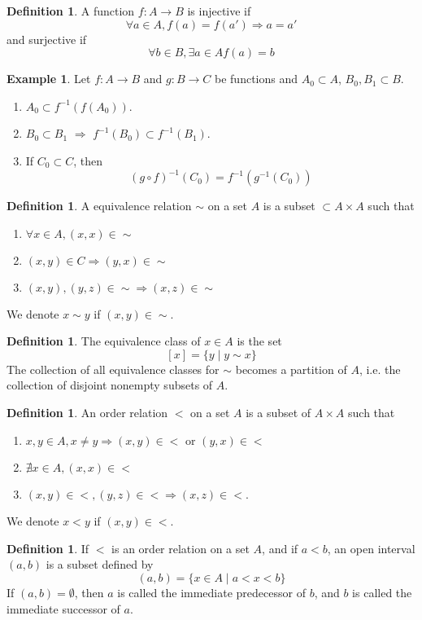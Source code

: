 \documentclass{beamer}
\theoremstyle{plain}
\theoremstyle{definition}
\newtheorem{defn}[thm]{Definition}
\newtheorem{exmp}[thm]{Example}
\begin{document}
\begin{frame}
\begin{defn}
	A function $f:A\to B$ is injective if 
	$$\forall a\in A, f(a)=f(a')\Rightarrow a=a'$$
	and surjective if
	$$\forall b\in B, \exists a\in A f(a) = b$$
\end{defn}
\begin{exmp}
	Let $f:A\to B$ and $g:B\to C$ be functions and
	$A_0\subset A$, $B_0, B_1\subset B$.
	\begin{enumerate}
		\item $A_0\subset f^{-1}(f(A_0))$.
		\item $B_0\subset B_1$ $\Rightarrow$ 
		$f^{-1}(B_0)\subset f^{-1}(B_1)$.
		\item If $C_0\subset C$, then
		$$(g\circ f)^{-1}(C_0) 
			= f^{-1}(g^{-1}(C_0))$$
	\end{enumerate}
\end{exmp}
\end{frame}

\begin{frame}
\begin{defn}
	A equivalence relation $\sim$ on a set $A$ 
	is a subset $\subset A\times A$ such that
	\begin{enumerate}
		\item $\forall x\in A, (x,x)\in \sim$
		\item $(x,y)\in C\Rightarrow (y,x)\in \sim$
		\item $(x,y), (y,z)\in \sim 
			\Rightarrow (x,z)\in \sim$
	\end{enumerate}
	We denote $x\sim y$ if $(x,y)\in \sim$.
\end{defn}
\begin{defn}
	The equivalence class of $x\in A$ is the set
	$$[x] = \{y\mid y\sim x\}$$
	The collection of all equivalence classes 
	for $\sim$ becomes a partition of $A$, 
	i.e. the collection of
	disjoint nonempty subsets of $A$.  
\end{defn}
\end{frame}

\begin{frame}
\begin{defn}
	An order relation $<$ on a set $A$ 
	is a subset of $A\times A$ such that
	\begin{enumerate}
		\item $x,y\in A, x\neq y \Rightarrow
			(x,y)\in < \textrm{ or } (y,x)\in <$
		\item $\nexists x\in A, (x,x)\in <$
		\item $(x,y)\in <, (y,z)\in < \Rightarrow
			(x,z)\in <$.
	\end{enumerate} 
	We denote $x<y$ if $(x,y)\in <$.
\end{defn}

\begin{defn}
	If $<$ is an order relation on a set $A$,
	and if $a<b$, an open interval $(a,b)$ 
	is a subset defined by
		$$(a,b) = \{x\in A\mid a<x<b\}$$
	If $(a,b) = \emptyset$, then $a$ is called the
	immediate predecessor of $b$, and $b$ is called
	the immediate successor of $a$.
\end{defn}
\end{frame}
\end{document}
